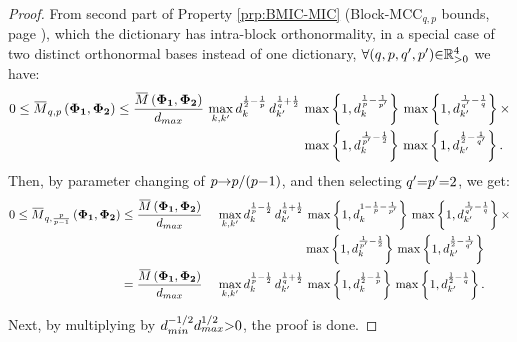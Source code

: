 \begin{proof}
From second part of Property \ref{prp:BMIC-MIC} (Block-MCC$_{q,p}$ bounds, page \pageref{prp:BMIC-MIC}), which the dictionary has intra-block orthonormality, in a special case of two distinct orthonormal bases instead of one dictionary, $\forall (q , p , q' , p') {\in} \mathbb{R}^4_{{>} 0}$ we have:
\begin{gather*}
\begin{aligned}
0 \leq \overbar{M}_{q,p}\myparanthese{\myPhiOne , \myPhiTwo} \leq 
\frac{\overbar{M}\myparanthese{\myPhiOne , \myPhiTwo}}{d_{max}} \, \max_{k,k'} d_{k}^{\frac12 - \frac1p} \, d_{k'}^{\frac1q + \frac12} \, &\max \mybrace{1 , d_k^{\frac1p - \frac{1}{p'}}} \, \max \mybrace{1 , d_{k'}^{\frac{1}{q'} - \frac1q}} \times \\
&\max \mybrace{1 , d_k^{\frac{1}{p'} -\frac12}} \, \max \mybrace{1 , d_{k'}^{\frac{1}{2} - \frac{1}{q'}}}.
\end{aligned}
\end{gather*}
Then, by parameter changing of $p {\to} p/(p {-} 1)$, and then selecting $q' {=} p' {=} 2$, we get:
\begin{gather*}
\begin{aligned}
0 \leq \overbar{M}_{q,\frac{p}{p-1}}\myparanthese{\myPhiOne , \myPhiTwo} &\leq 
\frac{\overbar{M}\myparanthese{\myPhiOne , \myPhiTwo}}{d_{max}} \, &&\max_{k,k'} d_{k}^{\frac1p - \frac12} \, d_{k'}^{\frac1q + \frac12} \, \max \mybrace{1 , d_k^{1 - \frac1p - \frac{1}{p'}}} \, \max \mybrace{1 , d_{k'}^{\frac{1}{q'} - \frac1q}} \times \\
& && \qquad \qquad \qquad \ \ \ \, \max \mybrace{1 , d_k^{\frac{1}{p'} -\frac12}} \, \max \mybrace{1 , d_{k'}^{\frac{1}{2} - \frac{1}{q'}}} \\
&= 
\frac{\overbar{M}\myparanthese{\myPhiOne , \myPhiTwo}}{d_{max}} \, &&\max_{k,k'} d_{k}^{\frac1p - \frac12} \, d_{k'}^{\frac1q + \frac12} \, \max \mybrace{1 , d_k^{\frac12 - \frac1p}} \, \max \mybrace{1 , d_{k'}^{\frac12 - \frac1q}}.
\end{aligned}
\end{gather*}
\iffalse
\begin{gather*}
\begin{aligned}
0 \leq \overbar{M}_{q,\frac{p}{p-1}}\myparanthese{\myPhiOne , \myPhiTwo} &\leq 
\frac{\overbar{M}\myparanthese{\myPhiOne , \myPhiTwo}}{d_{max}} \, \max_{k,k'} d_{k}^{\frac1p - \frac12} \, d_{k'}^{\frac1q + \frac12} \, d_{k'}^{1 - \frac1q} d_k^{\frac12} \\
&= \frac{\overbar{M}\myparanthese{\myPhiOne , \myPhiTwo}}{d_{max}} \, \max_{k,k'} d_{k}^{\frac1p} \, d_{k'}^{\frac32} \\
&\leq d_{max}^{\frac1p + \frac12} \, \overbar{M}\myparanthese{\myPhiOne , \myPhiTwo}.
\end{aligned}
\end{gather*}
\fi
Next, by multiplying by $d_{min}^{-1/2} d_{max}^{1/2} {>} 0$, the proof is done.
\end{proof}

